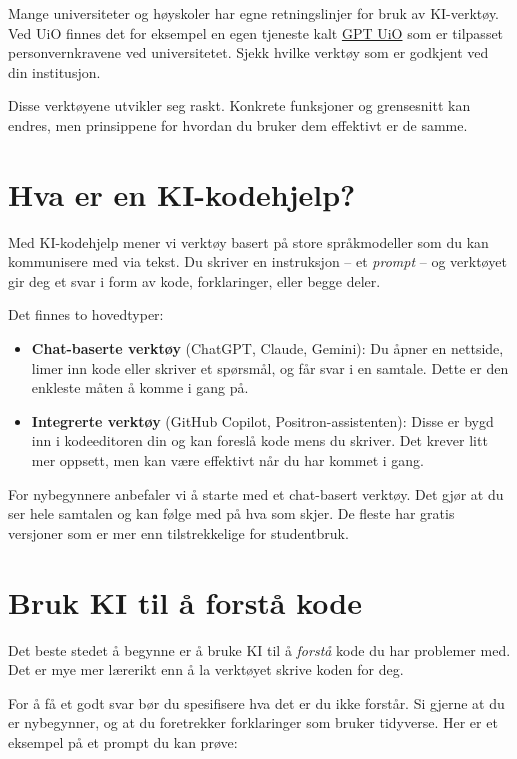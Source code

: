 \documentclass[
  norsk,
  letterpaper,
  DIV=11,
  numbers=noendperiod]{scrreprt}
\providecommand{\tightlist}{%
  \setlength{\itemsep}{0pt}\setlength{\parskip}{0pt}}
\theoremstyle{definition}
\theoremstyle{remark}
\begin{document}
Mange universiteter og høyskoler har egne retningslinjer for bruk av
KI-verktøy. Ved UiO finnes det for eksempel en egen tjeneste kalt
\href{https://www.uio.no/tjenester/it/ki/gpt-uio/}{GPT UiO} som er
tilpasset personvernkravene ved universitetet. Sjekk hvilke verktøy som
er godkjent ved din institusjon.

Disse verktøyene utvikler seg raskt. Konkrete funksjoner og grensesnitt
kan endres, men prinsippene for hvordan du bruker dem effektivt er de
samme.

\section{Hva er en KI-kodehjelp?}\label{hva-er-en-ki-kodehjelp}

Med KI-kodehjelp mener vi verktøy basert på store språkmodeller som du
kan kommunisere med via tekst. Du skriver en instruksjon -- et
\emph{prompt} -- og verktøyet gir deg et svar i form av kode,
forklaringer, eller begge deler.

Det finnes to hovedtyper:

\begin{itemize}
\tightlist
\item
  \textbf{Chat-baserte verktøy} (ChatGPT, Claude, Gemini): Du åpner en
  nettside, limer inn kode eller skriver et spørsmål, og får svar i en
  samtale. Dette er den enkleste måten å komme i gang på.
\item
  \textbf{Integrerte verktøy} (GitHub Copilot, Positron-assistenten):
  Disse er bygd inn i kodeeditoren din og kan foreslå kode mens du
  skriver. Det krever litt mer oppsett, men kan være effektivt når du
  har kommet i gang.
\end{itemize}

For nybegynnere anbefaler vi å starte med et chat-basert verktøy. Det
gjør at du ser hele samtalen og kan følge med på hva som skjer. De
fleste har gratis versjoner som er mer enn tilstrekkelige for
studentbruk.

\section{Bruk KI til å forstå
kode}\label{bruk-ki-til-uxe5-forstuxe5-kode}

Det beste stedet å begynne er å bruke KI til å \emph{forstå} kode du har
problemer med. Det er mye mer lærerikt enn å la verktøyet skrive koden
for deg.

For å få et godt svar bør du spesifisere hva det er du ikke forstår. Si
gjerne at du er nybegynner, og at du foretrekker forklaringer som bruker
tidyverse. Her er et eksempel på et prompt du kan prøve:
\end{document}
